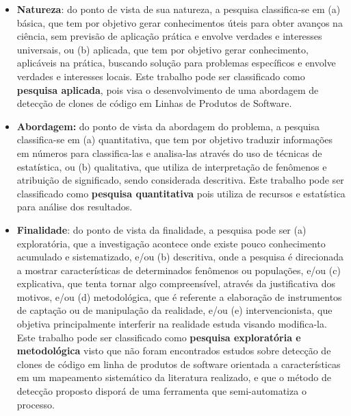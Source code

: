 \begin{itemize}
	\item \textbf{Natureza}: do ponto de vista de sua natureza, a pesquisa classifica-se em (a) básica, que tem por objetivo gerar conhecimentos úteis para obter avanços na ciência, sem previsão de aplicação prática e envolve verdades e interesses universais, ou (b) aplicada, que tem por objetivo gerar conhecimento, aplicáveis na prática, buscando solução para problemas específicos e envolve verdades e interesses locais. Este trabalho pode ser classificado como \textbf{pesquisa aplicada}, pois visa o desenvolvimento de uma abordagem de detecção de clones de código em Linhas de Produtos de Software.
	
	\item  \textbf{Abordagem:} do ponto de vista da abordagem do problema, a pesquisa classifica-se em (a) quantitativa, que tem por objetivo traduzir informações em números para classifica-las e analisa-las através do uso de técnicas de estatística, ou (b) qualitativa, que utiliza de interpretação de fenômenos e atribuição de significado, sendo considerada descritiva. Este trabalho pode ser classificado como \textbf{pesquisa quantitativa} pois utiliza de recursos e estatística para análise dos resultados.
	
	\item \textbf{Finalidade}: do ponto de vista da finalidade, a pesquisa pode ser (a) exploratória, que a investigação acontece onde existe pouco conhecimento acumulado e sistematizado,  e/ou (b) descritiva, onde a pesquisa é direcionada a mostrar características de determinados fenômenos ou populações, e/ou (c) explicativa, que tenta tornar algo compreensível, através da justificativa dos motivos, e/ou (d) metodológica, que é referente a elaboração de instrumentos de captação ou de manipulação da realidade, e/ou (e) intervencionista, que objetiva principalmente interferir na realidade estuda visando modifica-la. Este trabalho pode ser classificado como \textbf{pesquisa exploratória e metodológica} visto que não foram encontrados estudos sobre detecção de clones de código em linha de produtos de software orientada a características em um mapeamento sistemático da literatura realizado, e que o método de detecção proposto disporá de uma ferramenta que semi-automatiza o processo. 
	

\end{itemize}
